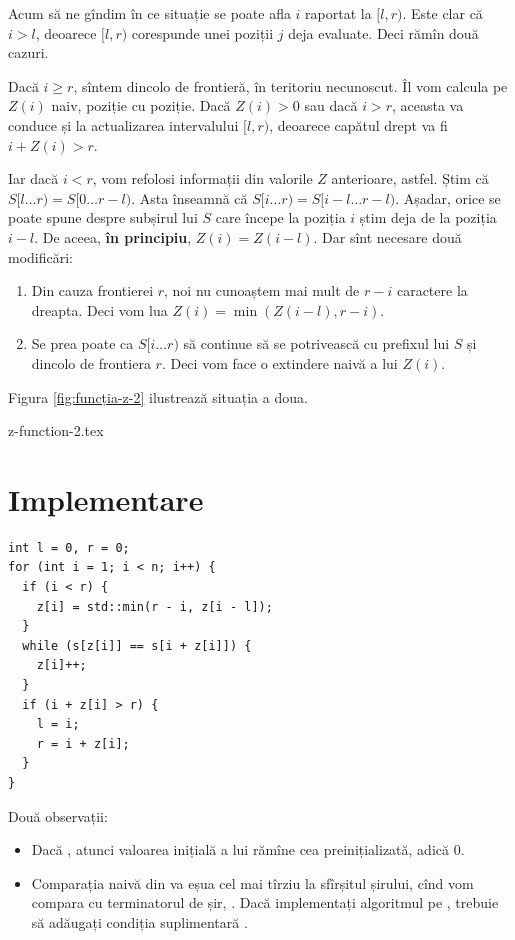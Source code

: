 \documentclass[../main.tex]{subfiles}
\begin{document}
Acum să ne gîndim în ce situație se poate afla $i$ raportat la $[l, r)$. Este clar că $i > l$, deoarece $[l, r)$ corespunde unei poziții $j$ deja evaluate. Deci rămîn două cazuri.

Dacă $i \geq r$, sîntem dincolo de frontieră, în teritoriu necunoscut. Îl vom calcula pe $Z(i)$ naiv, poziție cu poziție. Dacă $Z(i) > 0$ sau dacă $i > r$, aceasta va conduce și la actualizarea intervalului $[l, r)$, deoarece capătul drept va fi $i + Z(i) > r$.

Iar dacă $i < r$, vom refolosi informații din valorile $Z$ anterioare, astfel. Știm că $S[l \dots r) = S[0 \dots r - l)$. Asta înseamnă că $S[i \dots r) = S[i - l \dots r - l)$. Așadar, orice se poate spune despre subșirul lui $S$ care începe la poziția $i$ știm deja de la poziția $i - l$. De aceea, \textbf{în principiu}, $Z(i) = Z(i - l)$. Dar sînt necesare două modificări:

\begin{enumerate}
  \item Din cauza frontierei $r$, noi nu cunoaștem mai mult de $r - i$ caractere la dreapta. Deci vom lua $Z(i) = \min(Z(i - l), r - i)$.
  \item Se prea poate ca $S[i \dots r)$ să continue să se potrivească cu prefixul lui $S$ și dincolo de frontiera $r$. Deci vom face o extindere naivă a lui $Z(i)$.
\end{enumerate}

Figura \ref{fig:funcția-z-2} ilustrează situația a doua.

{z-function-2.tex}


\section{Implementare}

\begin{verbatim}
int l = 0, r = 0;
for (int i = 1; i < n; i++) {
  if (i < r) {
    z[i] = std::min(r - i, z[i - l]);
  }
  while (s[z[i]] == s[i + z[i]]) {
    z[i]++;
  }
  if (i + z[i] > r) {
    l = i;
    r = i + z[i];
  }
}
\end{verbatim}

Două observații:

\begin{itemize}
  \item Dacă , atunci valoarea inițială a lui  rămîne cea preinițializată, adică 0.
  \item Comparația naivă din  va eșua cel mai tîrziu la sfîrșitul șirului, cînd vom compara  cu terminatorul de șir, . Dacă implementați algoritmul pe , trebuie să adăugați condiția suplimentară .
\end{itemize}
\end{document}
